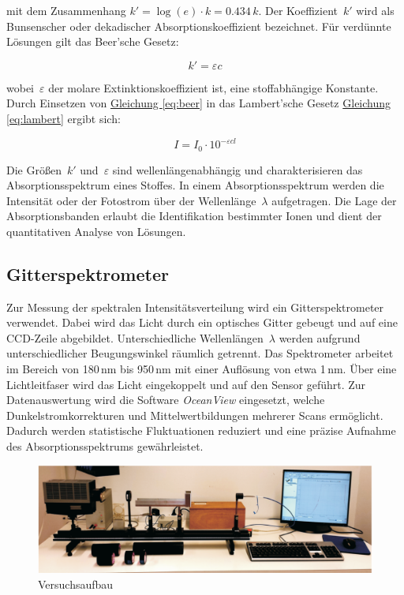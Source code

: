 mit dem Zusammenhang $k' = \log(e) \cdot k = 0.434\,k$. Der Koeffizient~$k'$ wird als Bunsenscher oder dekadischer Absorptionskoeffizient bezeichnet. Für verdünnte Lösungen gilt das Beer'sche Gesetz:

\begin{equation}
    k' = \varepsilon c
    \label{eq:beer}
\end{equation}

wobei~$\varepsilon$ der molare Extinktionskoeffizient ist, eine stoffabhängige Konstante. Durch Einsetzen von \hyperref[eq:beer]{Gleichung \ref*{eq:beer}} in das Lambert'sche Gesetz \hyperref[eq:lambert]{Gleichung \ref*{eq:lambert}} ergibt sich:

\begin{equation}
    I = I_0 \cdot 10^{-\varepsilon c l}
    \label{eq:combined}
\end{equation}

Die Größen~$k'$ und~$\varepsilon$ sind wellenlängenabhängig und charakterisieren das Absorptionsspektrum eines Stoffes. In einem Absorptionsspektrum werden die Intensität oder der Fotostrom über der Wellenlänge~$\lambda$ aufgetragen. Die Lage der Absorptionsbanden erlaubt die Identifikation bestimmter Ionen und dient der quantitativen Analyse von Lösungen.

\subsection*{Gitterspektrometer}
Zur Messung der spektralen Intensitätsverteilung wird ein Gitterspektrometer verwendet. Dabei wird das Licht durch ein optisches Gitter gebeugt und auf eine CCD-Zeile abgebildet. Unterschiedliche Wellenlängen~$\lambda$ werden aufgrund unterschiedlicher Beugungswinkel räumlich getrennt. Das Spektrometer arbeitet im Bereich von 180\,nm bis 950\,nm mit einer Auflösung von etwa 1\,nm. Über eine Lichtleitfaser wird das Licht eingekoppelt und auf den Sensor geführt. Zur Datenauswertung wird die Software \textit{OceanView} eingesetzt, welche Dunkelstromkorrekturen und Mittelwertbildungen mehrerer Scans ermöglicht. Dadurch werden statistische Fluktuationen reduziert und eine präzise Aufnahme des Absorptionsspektrums gewährleistet.

\begin{figure}[!ht]
    \centering
    \includegraphics[width=\textwidth]{img/34/Versuchsaufbau.png}
    \caption{Versuchsaufbau \cite{skript25}}
\end{figure}